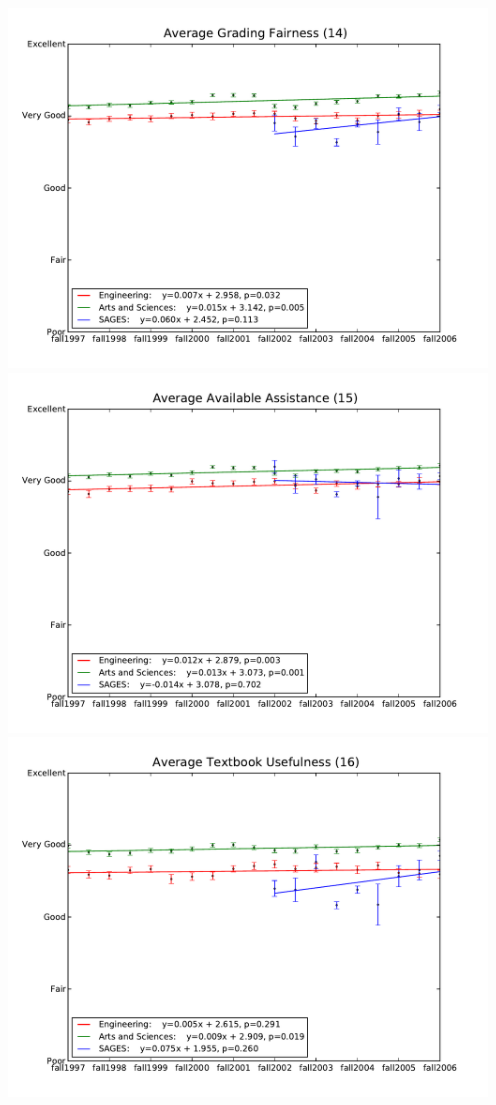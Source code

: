 \documentclass[12pt]{article}
\begin{document}
\begin{center}
    \includegraphics[width=5in]{figures/14_fair_grading_over_time.pdf} \\
    \includegraphics[width=5in]{figures/15_assistance_over_time.pdf} \\
    \includegraphics[width=5in]{figures/16_textbook_over_time.pdf} \\

\end{center}
\end{document}
